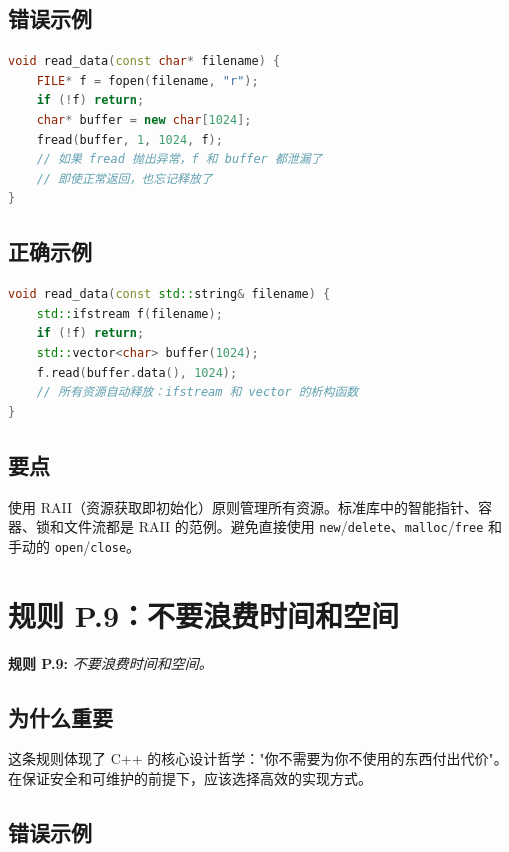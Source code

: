 \subsection{错误示例}

\begin{lstlisting}[language=C++]
void read_data(const char* filename) {
    FILE* f = fopen(filename, "r");
    if (!f) return;
    char* buffer = new char[1024];
    fread(buffer, 1, 1024, f);
    // 如果 fread 抛出异常，f 和 buffer 都泄漏了
    // 即使正常返回，也忘记释放了
}
\end{lstlisting}

\subsection{正确示例}

\begin{lstlisting}[language=C++]
void read_data(const std::string& filename) {
    std::ifstream f(filename);
    if (!f) return;
    std::vector<char> buffer(1024);
    f.read(buffer.data(), 1024);
    // 所有资源自动释放：ifstream 和 vector 的析构函数
}
\end{lstlisting}

\subsection{要点}
使用 RAII（资源获取即初始化）原则管理所有资源。标准库中的智能指针、容器、锁和文件流都是 RAII 的范例。避免直接使用 \texttt{new}/\allowbreak{}\texttt{delete}、\texttt{malloc}/\allowbreak{}\texttt{free} 和手动的 \texttt{open}/\allowbreak{}\texttt{close}。

\section{规则 P.9：不要浪费时间和空间}

\textbf{规则 P.9:} \textit{不要浪费时间和空间。}

\subsection{为什么重要}

这条规则体现了 C++ 的核心设计哲学："你不需要为你不使用的东西付出代价"。在保证安全和可维护的前提下，应该选择高效的实现方式。

\subsection{错误示例}

